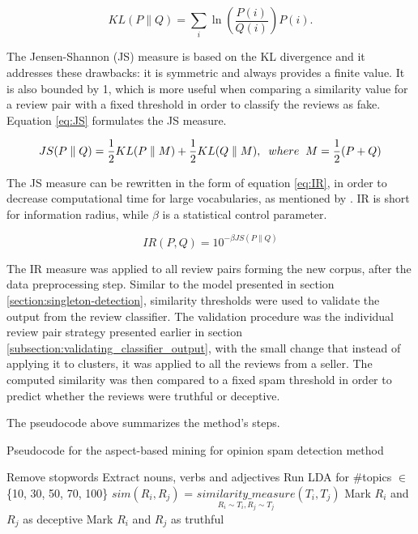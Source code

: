 \begin{equation}\label{eq:KL}
KL(P\|Q) = \sum_i \ln\left(\frac{P(i)}{Q(i)}\right) P(i).\!
\end{equation}

The Jensen-Shannon (JS) measure is based on the KL divergence and it addresses these drawbacks: it is symmetric and always provides a finite value. It is also bounded by 1, which is more useful when comparing a similarity value for a review pair with a fixed threshold in order to classify the reviews as fake. Equation \ref{eq:JS} formulates the JS measure.

\begin{equation}\label{eq:JS}
JS(P \parallel Q)= \frac{1}{2}KL(P \parallel M)+\frac{1}{2}KL(Q \parallel M), \hspace{0.2cm} where \hspace{0.2cm} M=\frac{1}{2}(P+Q)
\end{equation}

The JS measure can be rewritten in the form of equation \ref{eq:IR}, in order to decrease computational time for large vocabularies, as mentioned by \citet{dagan1999similarity}. IR is short for information radius, while {$\beta$} is 
a statistical control parameter.

\begin{equation}\label{eq:IR}
IR(P,Q) = 10^{-\beta{JS(P \parallel Q)}}
\end{equation}

The IR measure was applied to all review pairs forming the new corpus, after the data preprocessing step. Similar to the model presented in section \ref{section:singleton-detection}, similarity thresholds were used to validate the output from the review classifier. The validation procedure was the individual review pair strategy presented earlier in section \ref{subsection:validating_classifier_output}, with the small change that instead of applying it to clusters, it was applied to all the reviews from a seller. The computed similarity was then compared to a fixed spam threshold in order to predict whether the reviews were truthful or deceptive. 

The pseudocode above summarizes the method's steps.
\begin{algorithm}
\caption*{Pseudocode for the aspect-based mining for opinion spam detection method}
\label{alg:aspect-mining}
\begin{algorithmic}[1]
		\State Remove stopwords
	  	\State Extract nouns, verbs and adjectives
  	\EndFor
  	\State Run LDA for \#topics {$\in$} \{10, 30, 50, 70, 100\}
		\State $sim(R_i, R_j)$ = $\underset{R_i{\sim}T_i, R_j{\sim}T_j}{similarity\_measure}(T_i, T_j)$
		\EndFor
				\State Mark $R_i$ and $R_j$ as deceptive
			\Else 
				\State Mark $R_i$ and $R_j$ as truthful
			\EndIf
		\EndFor
	\EndFor
\end{algorithmic}
\end{algorithm}

